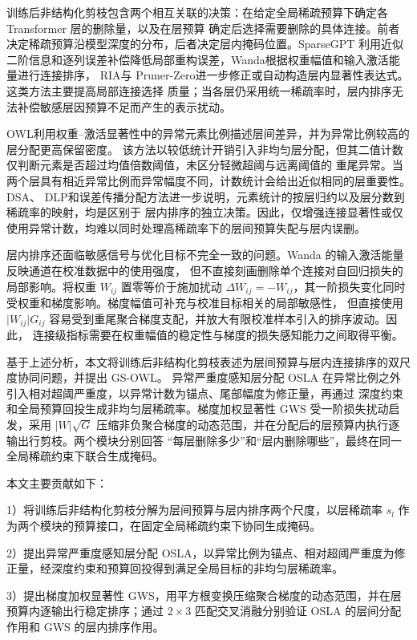 \documentclass[UTF8,fontset=fandol]{ctexart}
\newcommand{\method}{GS-OWL}
\begin{document}
训练后非结构化剪枝包含两个相互关联的决策：在给定全局稀疏预算下确定各 Transformer 层的删除量，以及在层预算
确定后选择需要删除的具体连接。前者决定稀疏预算沿模型深度的分布，后者决定层内掩码位置。SparseGPT\cite{sparsegpt}
利用近似二阶信息和逐列误差补偿降低局部重构误差，Wanda\cite{wanda}根据权重幅值和输入激活能量进行连接排序，
RIA\cite{ria}与 Pruner-Zero\cite{prunerzero}进一步修正或自动构造层内显著性表达式。这类方法主要提高局部连接选择
质量；当各层仍采用统一稀疏率时，层内排序无法补偿敏感层因预算不足而产生的表示扰动。

OWL\cite{owl}利用权重--激活显著性中的异常元素比例描述层间差异，并为异常比例较高的层分配更高保留密度。
该方法以较低统计开销引入非均匀层分配，但其二值计数仅判断元素是否超过均值倍数阈值，未区分轻微超阈与远离阈值的
重尾异常。当两个层具有相近异常比例而异常幅度不同，计数统计会给出近似相同的层重要性。DSA\cite{dsa}、
DLP\cite{dlp}和误差传播分配方法\cite{atp}进一步说明，元素统计的按层归约以及层分数到稀疏率的映射，均是区别于
层内排序的独立决策。因此，仅增强连接显著性或仅使用异常计数，均难以同时处理高稀疏率下的层间预算失配与层内误删。

层内排序还面临敏感信号与优化目标不完全一致的问题。Wanda 的输入激活能量反映通道在校准数据中的使用强度，
但不直接刻画删除单个连接对自回归损失的局部影响。将权重 $W_{ij}$ 置零等价于施加扰动
$\Delta W_{ij}=-W_{ij}$，其一阶损失变化同时受权重和梯度影响。梯度幅值可补充与校准目标相关的局部敏感性，
但直接使用 $\lvert W_{ij}\rvert G_{ij}$ 容易受到重尾聚合梯度支配，并放大有限校准样本引入的排序波动。因此，
连接级指标需要在权重幅值的稳定性与梯度的损失感知能力之间取得平衡。

基于上述分析，本文将训练后非结构化剪枝表述为层间预算与层内连接排序的双尺度协同问题，并提出 \method。
异常严重度感知层分配 OSLA 在异常比例之外引入相对超阈严重度，以异常计数为锚点、尾部幅度为修正量，再通过
深度约束和全局预算回投生成非均匀层稀疏率。梯度加权显著性 GWS 受一阶损失扰动启发，采用
$\lvert W\rvert\sqrt{G}$ 压缩非负聚合梯度的动态范围，并在分配后的层预算内执行逐输出行剪枝。两个模块分别回答
“每层删除多少”和“层内删除哪些”，最终在同一全局稀疏约束下联合生成掩码。

本文主要贡献如下：

1）将训练后非结构化剪枝分解为层间预算与层内排序两个尺度，以层稀疏率 $s_l$ 作为两个模块的预算接口，在固定全局稀疏约束下协同生成掩码。

2）提出异常严重度感知层分配 OSLA，以异常比例为锚点、相对超阈严重度为修正量，经深度约束和预算回投得到满足全局目标的非均匀层稀疏率。

3）提出梯度加权显著性 GWS，用平方根变换压缩聚合梯度的动态范围，并在层预算内逐输出行稳定排序；通过 $2\times3$ 匹配交叉消融分别验证 OSLA 的层间分配作用和 GWS 的层内排序作用。
\end{document}
